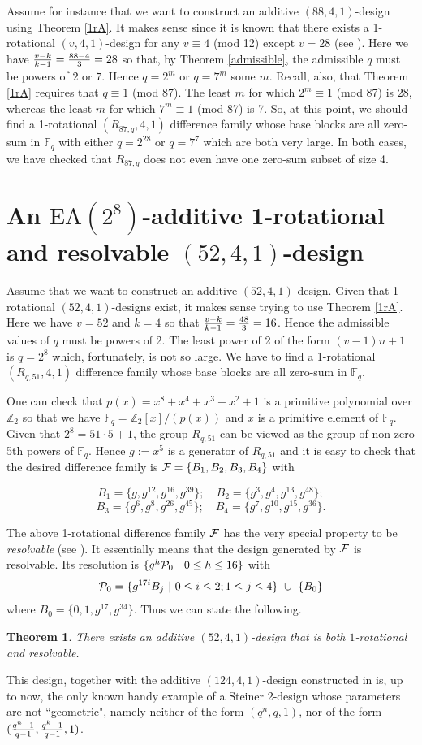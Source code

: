 \documentclass[a4paper, 11pt]{article}
\newtheorem{theorem}{Theorem}[section]
\theoremstyle{definition}
\theoremstyle{definition}
\theoremstyle{definition}
\newcommand{\Z}{\mathbb{Z}}
\newcommand{\F}{\mathbb{F}}
\numberwithin{equation}{section}
\begin{document}
Assume for instance that we want to construct an additive $(88,4,1)$-design using Theorem \ref{1rA}.
It makes sense since it is known that there exists a 1-rotational $(v,4,1)$-design for any $v\equiv4$ (mod 12)
except $v=28$ (see \cite{Zhao}).
Here we have ${v-k\over k-1}={88-4\over3}=28$ so that, by Theorem \ref{admissible}, the admissible $q$
must be powers of $2$ or $7$. Hence $q=2^m$ or $q=7^m$ some $m$. Recall, also, that Theorem \ref{1rA}
requires that $q\equiv 1$ (mod 87). The least $m$ for which $2^m\equiv1$ (mod 87) is $28$, whereas the least
$m$ for which $7^m\equiv1$ (mod 87) is 7. So, at this point, we should find a 
1-rotational $(R_{87,q},4,1)$ difference family whose base blocks are all zero-sum in $\F_q$
with either $q=2^{28}$ or $q=7^7$ which are both very large. In both cases, we have checked that $R_{87,q}$ does not even have
one zero-sum subset of size 4.


\section{An $\mathrm{EA}(2^8)$-additive 1-rotational and resolvable $(52,4,1)$-design}

Assume that we want to construct an additive $(52,4,1)$-design.
Given that 1-rotational $(52,4,1)$-designs exist,
it makes sense trying to use Theorem \ref{1rA}.
Here we have $v=52$ and $k=4$ so that ${v-k\over k-1}={48\over3}=16$. Hence the admissible values of $q$
must be powers of 2. The least power of 2 of the form $(v-1)n+1$ is $q=2^8$ which,
fortunately, is not so large. We have to find a 1-rotational $(R_{q,51},4,1)$ difference family
whose base blocks are all zero-sum in $\F_{q}$.

One can check that $p(x)=x^8+x^4+x^3+x^2+1$ is a primitive polynomial over $\Z_2$ so that
we have $\F_{q}=\Z_2[x]/(p(x))$ and $x$ is a primitive element of $\F_q$.
Given that $2^8=51\cdot 5+1$, the group $R_{q,51}$ can be viewed as the group of non-zero 
5th powers of $\F_q$. Hence  $g:=x^5$ is a generator of $R_{q,51}$ and it is easy to check that the desired
difference family is ${\cal F}=\{B_1,B_2,B_3,B_4\}$ with 

$$B_1=\{g, g^{12}, g^{16}, g^{39}\}; \quad B_2=\{g^3, g^4, g^{13}, g^{48}\};$$
$$B_3=\{g^6, g^{8}, g^{26}, g^{45}\};\quad B_4=\{g^7, g^{10}, g^{15}, g^{36}\}.$$

The above 1-rotational difference family $\cal F$ has the very special property to be {\it resolvable}
(see \cite{BZ}). It essentially means that the design generated by $\cal F$ is resolvable.
Its resolution is $\{g^h{\cal P}_0 \ | \ 0\leq h\leq 16\}$ with $${\cal P}_0=\{g^{17i}B_j \ | \ 0\leq i\leq 2; 1\leq j\leq 4 \} \ \cup \ \{B_0\}$$
where $B_0=\{0,1,g^{17},g^{34}\}$.
Thus we can state the following.
\begin{theorem} There exists an additive $(52,4,1)$-design that is both $1$-rotational and resolvable.
\end{theorem}
This design, together with the 
additive $(124,4,1)$-design constructed in \cite{BMN} is, up to now, the
only known handy example of a Steiner 2-design whose
parameters are not ``geometric", namely neither of the form $(q^n,q,1)$, nor of the form $({q^n-1\over q-1},{q^k-1\over q-1},1)$.
\end{document}
